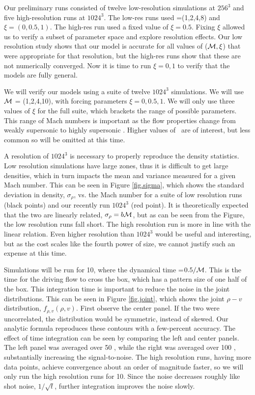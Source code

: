 Our preliminary runs consisted of twelve low-resolution simulations at $256^3$
and five high-resolution runs at $1024^3$.  The low-res runs used
\mach=(1,2,4,8) and $\xi=(0,0.5,1)$.  The high-res run used a fixed value of
$\xi=0.5$.  Fixing $\xi$ allowed us to verify a subset of parameter space and
explore resolution effects.      Our low resolution study shows that our model is
accurate for all values of ($\mathcal{M},\xi$) that were appropriate for that
resolution, but the high-res runs show that these are not numerically converged.
Now it is time to run $\xi=0,1$ to verify that the models are fully
general. 

We will verify our models using a suite of twelve $1024^3$ simulations.  We will use
$\mathcal{M}$ = (1,2,4,10), with forcing parameters $\xi=0,0.5,1$.   We will
only use three values of $\xi$ for the full suite, which brackets the range of
possible parameters.  This range of Mach numbers is important as the flow
properties change from weakly supersonic  to highly supersonic .
Higher values of \mach\ are of interest, but less common so will be omitted at
this time.

A resolution of $1024^3$ is necessary to properly reproduce the density
statistics.  Low resolution simulations have large zones, thus it is difficult
to get large densities, which in turn impacts the mean and variance measured
for a given Mach number.  This can be seen in Figure \ref{fig.sigma}, which
shows the standard deviation in density, $\sigma_\rho$, vs. the Mach number for
a suite of low resolution runs (black points) and our recently run $1024^3$ (red
point).  It
is theoretically expected that the two are linearly related, $\sigma_\rho = b
\mathcal{M}$, but as can be seen from the Figure, the low resolution runs fall short.
The high resolution run is more in line with the linear relation.  Even higher 
resolution than $1024^3$ would be useful and interesting, but as the cost scales like the
fourth power of size, we cannot justify such an expense at this time.

Simulations will be run for 10\tdyn, where the dynamical time \tdyn=$0.5/\mathcal{M}$.
This is the time for the driving flow to cross the box, which has a pattern size
of one half of the box.  This integration time is important to reduce the noise
in the joint distributions.  This can be seen in Figure \ref{fig.joint}, which
shows the joint $\rho-v$ distribution, $f_{\rho,v}(\rho,v)$.  First observe the
center panel.  If the
two were uncorrelated, the distribution would be symmetric, instead of skewed.
Our analytic formula reproduces these contours with a few-percent accuracy.  The effect of time integration
can be seen by comparing the left and center panels.  The left panel was averaged
over 50 \tdyn, while the right was averaged over 100 \tdyn, substantially
increasing the signal-to-noise.  The high resolution runs, having more data
points, achieve convergence about an order of magnitude faster, so we will only
run the high resolution runs for 10\tdyn.  Since the noise decreases roughly
like shot noise, $1/\sqrt{t}$, further integration improves the noise slowly.





